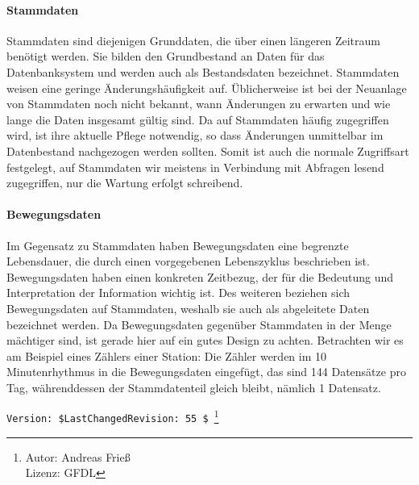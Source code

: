 \paragraph{Stammdaten}
Stammdaten sind diejenigen Grunddaten, die über einen längeren Zeitraum benötigt werden. Sie bilden den Grundbestand an Daten für das Datenbanksystem und werden auch als Bestandsdaten bezeichnet. Stammdaten weisen eine geringe Änderungshäufigkeit auf. Üblicherweise ist bei der Neuanlage von Stammdaten noch nicht bekannt, wann Änderungen zu erwarten und wie lange die Daten insgesamt gültig sind. Da auf Stammdaten häufig zugegriffen wird, ist ihre aktuelle Pflege notwendig, so dass Änderungen unmittelbar im Datenbestand nachgezogen werden sollten. Somit ist auch die normale Zugriffsart festgelegt, auf Stammdaten wir meistens in Verbindung mit Abfragen lesend zugegriffen, nur die Wartung erfolgt schreibend.

\paragraph{Bewegungsdaten}
Im Gegensatz zu Stammdaten haben Bewegungsdaten eine begrenzte Lebensdauer, die durch einen vorgegebenen Lebenszyklus beschrieben ist. Bewegungsdaten haben einen konkreten Zeitbezug, der für die Bedeutung und Interpretation der Information wichtig ist. Des weiteren beziehen sich Bewegungsdaten auf Stammdaten, weshalb sie auch als abgeleitete Daten bezeichnet werden. Da Bewegungsdaten gegenüber Stammdaten in der Menge mächtiger sind, ist gerade hier auf ein gutes Design zu achten. Betrachten wir es am Beispiel eines Zählers einer Station: Die Zähler werden im 10 Minutenrhythmus in die Bewegungsdaten eingefügt, das sind 144 Datensätze pro Tag, währenddessen der Stammdatenteil gleich bleibt, nämlich 1 Datensatz.

\verb|Version: $LastChangedRevision: 55 $ |\footnote{ Autor: Andreas Frieß\\Lizenz: GFDL}
